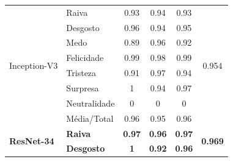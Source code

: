 \documentclass{beamer}
\begin{document}
\begin{frame}
\begin{table}[]
\begin{tabular}{llcccc}
\multirow{8}{*}{Inception-V3}     & Raiva                 & 0.93                                  & 0.94                                   & 0.93                                  & \multirow{8}{*}{0.954}                \\
                                       & Desgosto              & 0.96                                  & 0.94                                   & 0.95                                  &                                       \\
                                       & Medo                  & 0.89                                  & 0.96                                   & 0.92                                  &                                       \\
                                       & Felicidade            & 0.99                                  & 0.98                                   & 0.99                                  &                                       \\
                                       & Tristeza              & 0.91                                  & 0.97                                   & 0.94                                  &                                       \\
                                       & Surpresa              & 1                                     & 0.94                                   & 0.97                                  &                                       \\
                                       & Neutralidade          & 0                                     & 0                                      & 0                                     &                                       \\
                                       & Média/Total           & 0.96                                  & 0.95                                   & 0.96                                  &                                       \\ \hline
\multirow{8}{*}{\textbf{ResNet-34}} & \textbf{Raiva}        & \textbf{0.97}                         & \textbf{0.96}                          & \textbf{0.97}                         & \multirow{8}{*}{\textbf{0.969}}       \\
                                       & \textbf{Desgosto}     & \textbf{1}                            & \textbf{0.92}                          & \textbf{0.96}                         &                                       \\

\end{tabular}
\end{table}
\end{frame}
\end{document}
